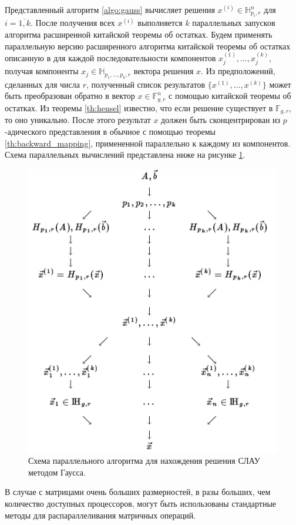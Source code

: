 \documentclass[master, och, times, pract]{sty/SCWorks}
\theoremstyle{plain}
\theoremstyle{definition}
\numberwithin{equation}{section}
\begin{document}
Представленный алгоритм \ref{algo:gauss} вычисляет решения $x^{(i)} \in \mathbb{H}_{p_i,r}^n$ для $i = \overline{1,k}$. После получения всех $x^{(i)}$ выполняется $k$ параллельных запусков алгоритма расширенной китайской теоремы об остатках. Будем применять параллельную версию расширенного алгоритма китайской теоремы об остатках описанную в \cite{bib:numbers:limongelli} для каждой последовательности компонентов $x_j^{(1)}, \dots, x_j^{(k)}$, получая компоненты $x_j \in \mathbb{H}_{p_1,\dots,p_k,r}$ вектора решения $x$.
Из предположений, сделанных для числа $r$, полученный список результатов $\{x^{(1)},\dots,x^{(k)}\}$ может быть преобразован обратно в вектор $x \in \mathbb{F}_{g,r}^n$ с помощью китайской теоремы об остатках. Из теоремы \ref{th:hensel} известно, что если решение существует в $\mathbb{F}_{g,r}$, то оно уникально.
После этого результат $x$ должен быть сконцентрирован из $p$-адического представления в обычное с помощью теоремы \ref{th:backward_mapping}, примененной параллельно к каждому из компонентов. Схема параллельных вычислений представлена ниже на рисунке \ref{img:multi:gauss}.

\begin{figure}[H]
\centerline{\includegraphics[width=0.7\linewidth]{images/multi/native.png}}
\caption{Схема параллельного алгоритма для нахождения решения СЛАУ методом Гаусса.}
\label{img:multi:gauss}
\end{figure}


В случае с матрицами очень больших размерностей, в разы больших, чем количество доступных процессоров, могут быть использованы стандартные методы для распараллеливания матричных операций.
\end{document}

